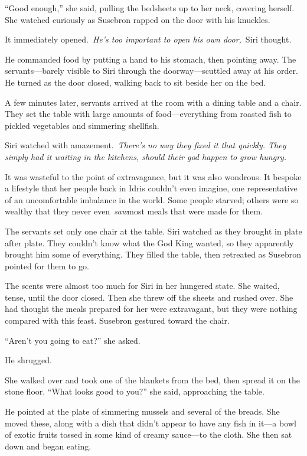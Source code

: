 “Good enough,” she said, pulling the bedsheets up to her neck, covering herself. She watched curiously as Susebron rapped on the door with his knuckles.

It immediately opened.~\textit{He’s too important to open his own door,}~Siri thought.

He commanded food by putting a hand to his stomach, then pointing away. The servants—barely visible to Siri through the doorway—scuttled away at his order. He turned as the door closed, walking back to sit beside her on the bed.

A few minutes later, servants arrived at the room with a dining table and a chair. They set the table with large amounts of food—everything from roasted fish to pickled vegetables and simmering shellfish.

Siri watched with amazement.~\textit{There’s no way they fixed it that quickly. They simply had it waiting in the kitchens, should their god happen to grow hungry.}

It was wasteful to the point of extravagance, but it was also wondrous. It bespoke a lifestyle that her people back in Idris couldn’t even imagine, one representative of an uncomfortable imbalance in the world. Some people starved; others were so wealthy that they never even~\textit{saw}most meals that were made for them.

The servants set only one chair at the table. Siri watched as they brought in plate after plate. They couldn’t know what the God King wanted, so they apparently brought him some of everything. They filled the table, then retreated as Susebron pointed for them to go.

The scents were almost too much for Siri in her hungered state. She waited, tense, until the door closed. Then she threw off the sheets and rushed over. She had thought the meals prepared for her were extravagant, but they were nothing compared with this feast. Susebron gestured toward the chair.

“Aren’t you going to eat?” she asked.

He shrugged.

She walked over and took one of the blankets from the bed, then spread it on the stone floor. “What looks good to you?” she said, approaching the table.

He pointed at the plate of simmering mussels and several of the breads. She moved these, along with a dish that didn’t appear to have any fish in it—a bowl of exotic fruits tossed in some kind of creamy sauce—to the cloth. She then sat down and began eating.


